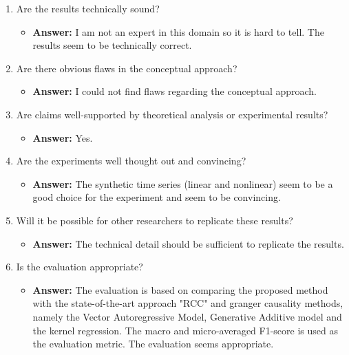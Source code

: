 \documentclass[a4paper]{article}
\begin{document}
\begin{enumerate}[label=(\alph*)]
	\item Are the results technically sound?
		\begin{itemize}
			\item \textbf{Answer:} I am not an expert in this domain so it is hard to tell. The results seem to be technically correct.
		\end{itemize}			
	
	
	\item Are there obvious flaws in the conceptual approach?
		\begin{itemize}
			\item \textbf{Answer:} I could not find flaws regarding the conceptual approach.
		\end{itemize}		
	
	
	\item Are claims well-supported by theoretical analysis or experimental results?
		\begin{itemize}
			\item \textbf{Answer:} Yes.
		\end{itemize}		
	
	\item Are the experiments well thought out and convincing?
		\begin{itemize}
			\item \textbf{Answer:} The synthetic time series (linear and nonlinear) seem to be a good choice for the experiment and seem to be convincing.
		\end{itemize}		
	
	
	\item Will it be possible for other researchers to replicate these results?
		\begin{itemize}
			\item \textbf{Answer:} The technical detail should be sufficient to replicate the results.
		\end{itemize}		
	
	
	\item Is the evaluation appropriate?
		\begin{itemize}
			\item \textbf{Answer:} The evaluation is based on comparing the proposed method with the state-of-the-art approach "RCC" and granger causality methods, namely the Vector Autoregressive Model, Generative Additive model and the kernel regression. The macro and micro-averaged F1-score is used as the evaluation metric. The evaluation seems appropriate.
		\end{itemize}		
	

\end{enumerate}
\end{document}
